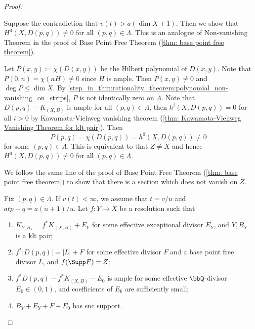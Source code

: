 \begin{proof}
        \begin{step}\label{step_in_thm:rationality_theorem:non-vanishing_on_strips}
            Suppose the contradiction that \(v(t) > a(\dim X + 1)\).
            Then we show that \(H^0(X,D(p,q)) \neq 0\) for all \((p,q) \in \Lambda\).
            This is an analogue of Non-vanishing Theorem in the proof of Base Point Free Theorem (\cref{thm: base point free theorem}).
        \end{step}
        Let \(P(x,y)\coloneqq \chi(D(x,y))\) be the Hilbert polynomial of \(D(x,y)\).
        Note that \(P(0,n) = \chi(nH) \neq 0\) since \(H\) is ample.
        Then \(P(x,y) \neq 0\) and \(\deg P \leq \dim X\).
        By \cref{step_in_thm:rationality_theorem:polynomial_non-vanishing_on_strips}, \(P\) is not identically zero on \(\Lambda\).
        Note that \(D(p,q) - K_{(X,B)}\) is ample for all \((p,q) \in \Lambda\), then \(h^i(X,D(p,q)) = 0\) for all \(i > 0\) by Kawamata-Viehweg vanishing theorem (\cref{thm: Kawamata-Viehweg Vanishing Theorem for klt pair}).
        Then 
        \[ P(p,q) = \chi(D(p,q)) = h^0(X,D(p,q)) \neq 0 \]
        for some \((p,q) \in \Lambda\).
        This is equivalent to that \(Z \neq X\) and hence \(H^0(X,D(p,q)) \neq 0\) for all \((p,q) \in \Lambda\).


        \begin{step}
            We follow the same line of the proof of Base Point Free Theorem (\cref{thm: base point free theorem}) to show that there is a section which does not vanish on \(Z\).
        \end{step}
        Fix \((p,q) \in \Lambda\).
        If \(v(t) < \infty\), we assume that \(t=v/u\) and \(atp-q = a(n+1)/u\).
        Let \(f:Y \to X\) be a resolution such that 
        \begin{enumerate}
            \item \(K_{Y,B_Y} = f^*K_{(X,B)} + E_Y\) for some effective exceptional divisor \(E_Y\), and \(Y,B_Y\) is a klt pair;
            \item \(f^*|D(p,q)| = |L| + F\) for some effective divisor \(F\) and a base point free divisor \(L\), and \(f(\Supp F) = Z\);
            \item \(f^*D(p,q) - f^*K_{(X,B)} - E_0\) is ample for some effective \(\bbQ\)-divisor \(E_0 \in (0,1)\), and coefficients of \(E_0\) are sufficiently small;
            \item \(B_Y + E_Y + F + E_0\) has snc support.
        \end{enumerate}


\end{proof}
